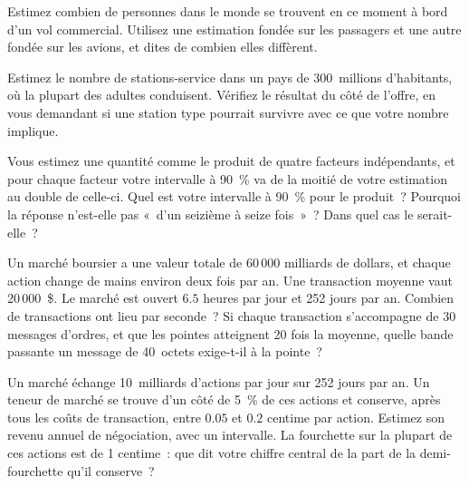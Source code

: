 \begin{question}\label{iq:iv1:estimation:10}
Estimez combien de personnes dans le monde se trouvent en ce moment à bord d'un vol commercial. Utilisez une estimation fondée sur les passagers et une autre fondée sur les avions, et dites de combien elles diffèrent.
\end{question}

\begin{question}\label{iq:iv1:estimation:11}
Estimez le nombre de stations-service dans un pays de 300~millions d'habitants, où la plupart des adultes conduisent. Vérifiez le résultat du côté de l'offre, en vous demandant si une station type pourrait survivre avec ce que votre nombre implique.
\end{question}

\begin{question}\label{iq:iv1:estimation:12}
Vous estimez une quantité comme le produit de quatre facteurs indépendants, et pour chaque facteur votre intervalle à 90~\% va de la moitié de votre estimation au double de celle-ci. Quel est votre intervalle à 90~\% pour le produit~? Pourquoi la réponse n'est-elle pas «~d'un seizième à seize fois~»~? Dans quel cas le serait-elle~?
\end{question}

\begin{question}\label{iq:iv1:estimation:13}
Un marché boursier a une valeur totale de 60\,000 milliards de dollars, et chaque action change de mains environ deux fois par an. Une transaction moyenne vaut 20\,000~\$. Le marché est ouvert $6.5$ heures par jour et 252 jours par an. Combien de transactions ont lieu par seconde~? Si chaque transaction s'accompagne de 30 messages d'ordres, et que les pointes atteignent 20 fois la moyenne, quelle bande passante un message de 40~octets exige-t-il à la pointe~?
\end{question}

\begin{question}\label{iq:iv1:estimation:14}
Un marché échange 10~milliards d'actions par jour sur 252 jours par an. Un teneur de marché se trouve d'un côté de 5~\% de ces actions et conserve, après tous les coûts de transaction, entre $0.05$ et $0.2$ centime par action. Estimez son revenu annuel de négociation, avec un intervalle. La fourchette sur la plupart de ces actions est de 1 centime~: que dit votre chiffre central de la part de la demi-fourchette qu'il conserve~?
\end{question}


